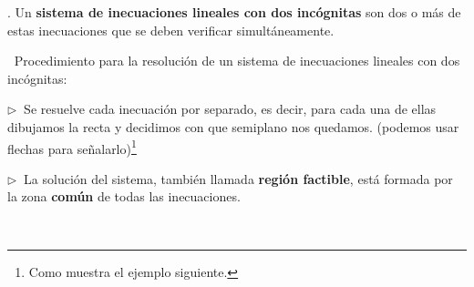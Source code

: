 \vspace{5mm}

\begin{theorem}
.	Un \textbf{sistema de inecuaciones lineales con dos incógnitas}	 son dos o más de estas inecuaciones que se deben verificar simultáneamente.

\vspace{5mm}
\begin{destacado}
$\ $
Procedimiento para la resolución de un sistema de inecuaciones lineales con dos incógnitas:

\vspace{4mm} $\triangleright\ $ Se resuelve cada inecuación por separado, es decir, para cada una de ellas dibujamos la recta y decidimos con que semiplano nos quedamos. (podemos usar flechas para señalarlo)\footnote{Como muestra el ejemplo siguiente.}

\vspace{4mm} $\triangleright\ $ La solución del sistema, también llamada \textbf{región factible}, está formada por la zona \textbf{común} de todas las inecuaciones.

$\ $	
\end{destacado}
\end{theorem}


